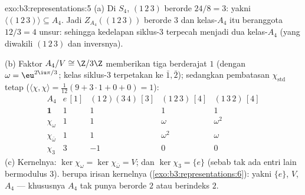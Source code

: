 \begin{solution}{exo:b3:representations:5}
(a) Di $S_4$,  $(1\,2\,3)$ berorde $24/8 =
3$: yakni $\langle(1\,2\,3)\rangle \subseteq A_4$. Jadi
$Z_{A_4}((1\,2\,3))$ berorde $3$ dan kelas-$A_4$ itu beranggota $12/3
= 4$ unsur: sehingga kedelapan siklus-$3$ terpecah menjadi dua kelas-$A_4$
(yang diwakili $(1\,2\,3)$ dan inversnya).

(b) Faktor $A_4/V \cong \Z/3\Z$ memberikan tiga  berderajat $1$
(dengan $\omega = \eu^{2\iu\pi/3}$; kelas siklus-$3$ terpetakan ke
$\bar1, \bar2$); sedangkan pembatasan $\chi_{\mathrm{std}}$
tetap  ($\langle\chi,\chi\rangle = \frac1{12}(9 + 3
\cdot 1 + 0 + 0) = 1$):
\[
\begin{array}{c|cccc}
A_4 & e\,[1] & (1\,2)(3\,4)\,[3] & (1\,2\,3)\,[4] &
(1\,3\,2)\,[4]\\
\hline
\mathbf 1 & 1 & 1 & 1 & 1\\
\chi_\omega & 1 & 1 & \omega & \omega^2\\
\chi_{\bar\omega} & 1 & 1 & \omega^2 & \omega\\
\chi_3 & 3 & -1 & 0 & 0
\end{array}
\]
(c) Kernelnya: $\ker\chi_\omega = \ker\chi_{\bar\omega} = V$;
dan $\ker\chi_3 = \{e\}$ (sebab tak ada entri lain bermodulus $3$).
 berupa irisan kernelnya
(\cref{exo:b3:representations:6}): yakni $\{e\}$, $V$, $A_4$ ---
khususnya $A_4$ tak punya  berorde $2$ atau berindeks
$2$.
\end{solution}

